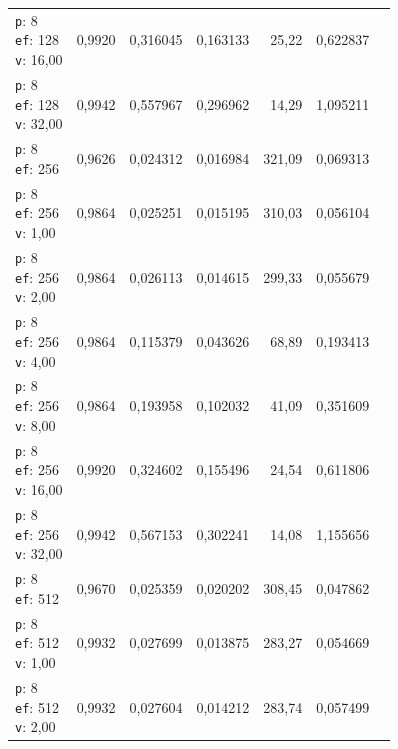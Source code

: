 \begin{table}[htbp]
\begin{tabularx}{\textwidth}{Xrrrrrr}
    \makecell{\texttt{p}: 8\\\texttt{ef}: 128\\\texttt{v}: 16,00} & 0,9920 & 0,316045 & 0,163133 & 25,22 & 0,622837 \\
    \makecell{\texttt{p}: 8\\\texttt{ef}: 128\\\texttt{v}: 32,00} & 0,9942 & 0,557967 & 0,296962 & 14,29 & 1,095211 \\
    \makecell{\texttt{p}: 8\\\texttt{ef}: 256} & 0,9626 & 0,024312 & 0,016984 & 321,09 & 0,069313 \\
    \makecell{\texttt{p}: 8\\\texttt{ef}: 256\\\texttt{v}: 1,00} & 0,9864 & 0,025251 & 0,015195 & 310,03 & 0,056104 \\
    \makecell{\texttt{p}: 8\\\texttt{ef}: 256\\\texttt{v}: 2,00} & 0,9864 & 0,026113 & 0,014615 & 299,33 & 0,055679 \\
    \makecell{\texttt{p}: 8\\\texttt{ef}: 256\\\texttt{v}: 4,00} & 0,9864 & 0,115379 & 0,043626 & 68,89 & 0,193413 \\
    \makecell{\texttt{p}: 8\\\texttt{ef}: 256\\\texttt{v}: 8,00} & 0,9864 & 0,193958 & 0,102032 & 41,09 & 0,351609 \\
    \makecell{\texttt{p}: 8\\\texttt{ef}: 256\\\texttt{v}: 16,00} & 0,9920 & 0,324602 & 0,155496 & 24,54 & 0,611806 \\
    \makecell{\texttt{p}: 8\\\texttt{ef}: 256\\\texttt{v}: 32,00} & 0,9942 & 0,567153 & 0,302241 & 14,08 & 1,155656 \\
    \makecell{\texttt{p}: 8\\\texttt{ef}: 512} & 0,9670 & 0,025359 & 0,020202 & 308,45 & 0,047862 \\
    \makecell{\texttt{p}: 8\\\texttt{ef}: 512\\\texttt{v}: 1,00} & 0,9932 & 0,027699 & 0,013875 & 283,27 & 0,054669 \\
    \makecell{\texttt{p}: 8\\\texttt{ef}: 512\\\texttt{v}: 2,00} & 0,9932 & 0,027604 & 0,014212 & 283,74 & 0,057499 \\

\end{tabularx}
\end{table}
